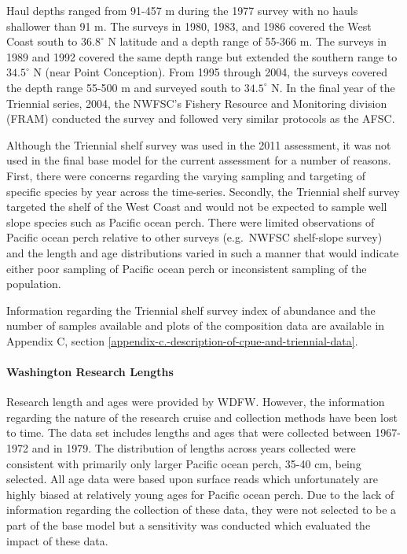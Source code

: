 \documentclass[12pt,]{article}
\let\oldparagraph\paragraph
\renewcommand{\paragraph}[1]{\oldparagraph{#1}\mbox{}}
\begin{document}
Haul depths ranged from 91-457 m during the 1977 survey with no hauls
shallower than 91 m. The surveys in 1980, 1983, and 1986 covered the
West Coast south to \(36.8^\circ\) N latitude and a depth range of
55-366 m. The surveys in 1989 and 1992 covered the same depth range but
extended the southern range to \(34.5^\circ\) N (near Point Conception).
From 1995 through 2004, the surveys covered the depth range 55-500 m and
surveyed south to \(34.5^\circ\) N. In the final year of the Triennial
series, 2004, the NWFSC's Fishery Resource and Monitoring division
(FRAM) conducted the survey and followed very similar protocols as the
AFSC.

Although the Triennial shelf survey was used in the 2011 assessment, it
was not used in the final base model for the current assessment for a
number of reasons. First, there were concerns regarding the varying
sampling and targeting of specific species by year across the
time-series. Secondly, the Triennial shelf survey targeted the shelf of
the West Coast and would not be expected to sample well slope species
such as Pacific ocean perch. There were limited observations of Pacific
ocean perch relative to other surveys (e.g.~NWFSC shelf-slope survey)
and the length and age distributions varied in such a manner that would
indicate either poor sampling of Pacific ocean perch or inconsistent
sampling of the population.

Information regarding the Triennial shelf survey index of abundance and
the number of samples available and plots of the composition data are
available in Appendix C, section
\ref{appendix-c.-description-of-cpue-and-triennial-data}.

\paragraph{Washington Research
Lengths}\label{washington-research-lengths}

Research length and ages were provided by WDFW. However, the information
regarding the nature of the research cruise and collection methods have
been lost to time. The data set includes lengths and ages that were
collected between 1967-1972 and in 1979. The distribution of lengths
across years collected were consistent with primarily only larger
Pacific ocean perch, 35-40 cm, being selected. All age data were based
upon surface reads which unfortunately are highly biased at relatively
young ages for Pacific ocean perch. Due to the lack of information
regarding the collection of these data, they were not selected to be a
part of the base model but a sensitivity was conducted which evaluated
the impact of these data.
\end{document}
